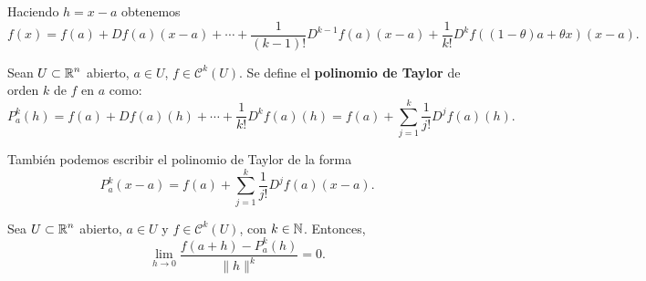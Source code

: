 \begin{observation}
Haciendo $\displaystyle h = x - a $ obtenemos 
\[f\left(x\right) = f\left(a\right) + Df\left(a\right)\left(x-a\right) + \cdots + \frac{1}{\left(k-1\right)!}D^{k-1}f\left(a\right)\left(x-a\right) + \frac{1}{k!}D^{k}f\left(\left(1-\theta \right)a + \theta x\right)\left(x-a\right) .\]
\end{observation}
\begin{definition}
Sean $\displaystyle U \subset \mathbb{R}^{n} $ abierto, $\displaystyle a \in U $, $\displaystyle f \in \mathcal{C}^{k}\left(U\right) $. Se define el \textbf{polinomio de Taylor} de orden $\displaystyle k $ de $\displaystyle f $ en $\displaystyle a $ como:
\[P^{k}_{a}\left(h\right)=f\left(a\right)+Df\left(a\right)\left(h\right)+\cdots + \frac{1}{k!}D^{k}f\left(a\right)\left(h\right) = f\left(a\right) + \sum^{k}_{j = 1} \frac{1}{j!}D^{j}f\left(a\right)\left(h\right).\]
\end{definition}
\begin{observation}
También podemos escribir el polinomio de Taylor de la forma
\[P_{a}^{k}\left(x-a\right) = f\left(a\right) + \sum^{k}_{j = 1}\frac{1}{j!}D^{j}f\left(a\right)\left(x-a\right) .\]
\end{observation}
\begin{colorary}
Sea $\displaystyle U\subset \mathbb{R}^{n} $ abierto, $\displaystyle a \in U $ y $\displaystyle f \in \mathcal{C}^{k}\left(U\right) $, con $\displaystyle k \in \mathbb{N} $. Entonces, 
\[\lim_{h \to 0}\frac{f\left(a+h\right)-P^{k}_{a}\left(h\right)}{\|h\|^{k}} = 0 .\]
\end{colorary}
